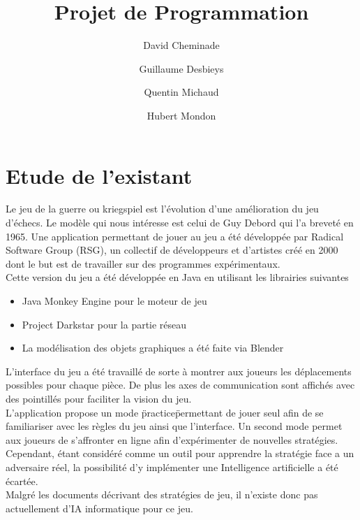 \documentclass[12pt]{article}
\begin{document}
\title{Projet de Programmation}
\author{David Cheminade\and Guillaume Desbieys\and Quentin Michaud\and Hubert Mondon}

\maketitle

\section{Etude de l'existant}

	Le jeu de la guerre ou kriegspiel est l'évolution d'une amélioration du jeu d'échecs.
	Le modèle qui nous intéresse est celui de Guy Debord qui l'a breveté en 1965.
	Une application permettant de jouer au jeu a été développée par Radical Software Group (RSG), un collectif de développeurs et d'artistes créé en 2000 dont le but est de travailler sur des programmes expérimentaux.\\[1\baselineskip]
	Cette version du jeu a été développée en Java en utilisant les librairies suivantes\\[1\baselineskip]

	\begin{itemize}
		\item Java Monkey Engine pour le moteur de jeu
		\item Project Darkstar pour la partie réseau
		\item La modélisation des objets graphiques a été faite via Blender\\[1\baselineskip]
	\end{itemize}

	L'interface du jeu a été travaillé de sorte à montrer aux joueurs les déplacements possibles pour chaque pièce. De plus les axes de communication sont affichés avec des pointillés pour faciliter la vision du jeu.\\[1\baselineskip]
	L'application propose un mode \"practice\" permettant de jouer seul afin de se familiariser avec les règles du jeu ainsi que l'interface.
	Un second mode permet aux joueurs de s'affronter en ligne afin d'expérimenter de nouvelles stratégies.\\[1\baselineskip]

	Cependant, étant considéré comme un outil pour apprendre la stratégie face a un adversaire réel, la possibilité d'y implémenter une Intelligence artificielle a été écartée.\\[1\baselineskip]
	Malgré les documents décrivant des stratégies de jeu, il n'existe donc pas actuellement d'IA informatique pour ce jeu.
\end{document}
